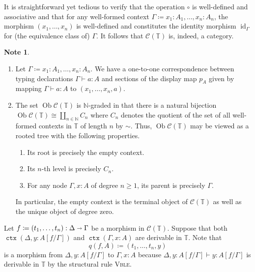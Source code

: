 \documentclass[10pt,letterpaper,cm]{nupset}
\theoremstyle{definition}
\newtheorem{note}[definition]{Note}
\theoremstyle{theorem}
\theoremstyle{remark}
\newcommand{\sra}{\shortrightarrow}
\DeclareMathOperator{\ob}{Ob}
\newcommand{\0}{\mathbf{0}}
\newcommand{\1}{\mathbf{1}}
\newcommand{\2}{\mathbf{2}}
\DeclareMathOperator{\ctx}{\mathtt{ctx}}
\renewcommand{\c}{\mathscr{C}}
\newcommand{\N}{\mathbb N}
\newcommand{\T}{\mathbb T}
\DeclareMathOperator{\idd}{id}
\newcommand{\be}{\begin{enumerate}}
\newcommand{\ee}{\end{enumerate}}
\begin{document}
It is straightforward yet tedious to verify that the operation $\circ$ is well-defined and associative and that for any well-formed context $\Gamma \coloneqq {x_1 :A_1, \ldots, x_n :A_n}$, the morphism $\left(x_1, \ldots, x_n\right)$ is well-defined and constitutes the identity morphism $\idd_{\Gamma}$ for (the equivalence class of) $\Gamma$. It follows that $\c(\T)$ is, indeed, a category. 

\begin{note}\label{terms} $ $
\be[label=(\arabic*)]
\item Let $\Gamma \coloneqq x_1:A_1, \ldots, x_n:A_n$. We have a one-to-one correspondence between typing declarations $\Gamma \vdash a : A$ and sections of the display map $p_A$ given by mapping $\Gamma \vdash a : A$ to $\left(x_1, \ldots, x_n, a\right)$.
\item  The set $\ob{\c(\T)}$ is $\N$-graded in that there is a natural bijection $\ob{\c(\T)} \cong \coprod_{n\in \N}C_n$ where $C_n$ denotes the quotient of the set of all well-formed contexts in $\T$ of length $n$ by $\sim$. Thus, $\ob{\c(\T)}$ may be viewed as a rooted tree with the following properties.  
\be
\item Its root is precisely the empty context.
\item Its $n$-th level is precisely $C_n$.
\item For any node $\Gamma, x:A$ of degree $n\geq 1$, its parent is precisely $\Gamma$. 
\ee
In particular, the empty context is the terminal object of $\c(\T)$ as well as the unique object of degree zero.
\ee
\end{note}


\medskip

Let $f \coloneqq \left(t_1, \ldots, t_n\right) : \Delta \sra \Gamma$ be a morphism in $\c(\T)$. Suppose that both $\ctx\left(\Delta, y : A\left[f/\Gamma\right]\right)$ and $\ctx\left(\Gamma, x :A\right)$ are derivable in $\T$. Note that $$q(f,A) \coloneqq \left(t_1, \ldots, t_n, y\right)$$ is a morphism from $\Delta, y : A\left[f/\Gamma\right]$ to $\Gamma, x :A$ because $\Delta, y : A\left[f/\Gamma\right] \vdash y : A\left[f/\Gamma\right]$ is derivable in $\T$ by the structural rule  \textsc{Vble}.
\end{document}
